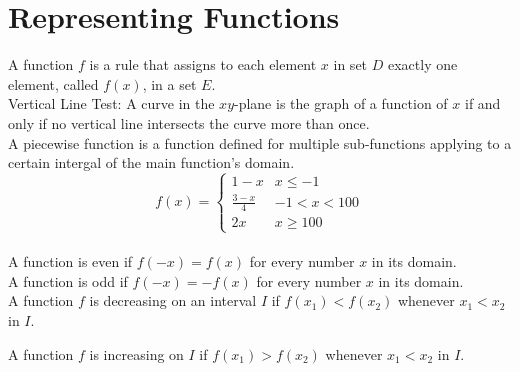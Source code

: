 %
%

\section{Representing Functions}

A function \(f\) is a rule that assigns to each element \(x\) in set \(D\) exactly one element, called \(f(x)\), in a set \(E\).\\

Vertical Line Test: A curve in the \(xy\)-plane is the graph of a function of \(x\) if and only if no vertical line intersects the curve more than once.\\

A piecewise function is a function defined for multiple sub-functions applying to a certain intergal of the main function's domain.\\


\[ f(x)=
    \begin{cases} 
      1-x & x\leq -1 \\
      \frac{3-x}{4} & -1 < x < 100 \\
      2x & x\geq 100
   \end{cases}
\]\\

A function is even if \(f(-x)=f(x)\) for every number \(x\) in its domain.\\

A function is odd if \(f(-x)=-f(x)\) for every number \(x\) in its domain.\\

A function \(f\) is decreasing on an interval \(I\) if \(f(x_1)<f(x_2)\) whenever \(x_1 < x_2\) in \(I\).

A function \(f\) is increasing on \(I\) if \(f(x_1)>f(x_2)\) whenever \(x_1<x_2\) in \(I\).\\